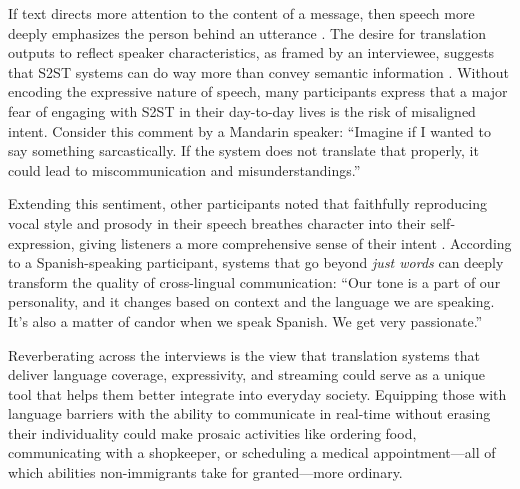 If text directs more attention to the content of a message, then speech more deeply emphasizes the person behind an utterance \citep{kraut1992task}. The desire for translation outputs to reflect speaker characteristics, as framed by an interviewee, suggests that S2ST systems can do way more than convey semantic information \citep{huang2023holistic}. Without encoding the expressive nature of speech, many participants express that a major fear of engaging with S2ST in their day-to-day lives is the risk of misaligned intent. Consider this comment by a Mandarin speaker: ``{Imagine if I wanted to say something sarcastically. If the system does not translate that properly, it could lead to miscommunication and misunderstandings.}''

Extending this sentiment, other participants noted that faithfully reproducing vocal style and prosody in their speech breathes character into their self-expression, giving listeners a more comprehensive sense of their intent \citep{du2021expressive}. According to a Spanish-speaking participant, systems that go beyond \textit{just words} can deeply transform the quality of cross-lingual communication: ``{Our tone is a part of our personality, and it changes based on context and the language we are speaking. It’s also a matter of candor when we speak Spanish. We get very passionate.}''

Reverberating across the interviews is the view that translation systems that deliver language coverage, expressivity, and streaming could serve as a unique tool that helps them better integrate into everyday society. Equipping those with language barriers with the ability to communicate in real-time without erasing their individuality could make prosaic activities like ordering food, communicating with a shopkeeper, or scheduling a medical appointment—all of which abilities non-immigrants take for granted—more ordinary.
















































